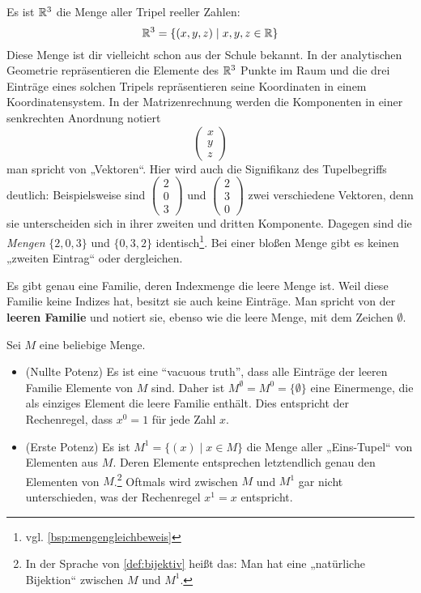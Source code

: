 \begin{bsp}
    Es ist $\mathbb R^3$ die Menge aller Tripel reeller Zahlen:
        \[ \mathbb R^3 = \{(x,y,z) \mid x,y,z\in \mathbb R \} \]
    Diese Menge ist dir vielleicht schon aus der Schule bekannt. In der analytischen Geometrie repräsentieren die Elemente des $\mathbb R^3$ Punkte im Raum und die drei Einträge eines solchen Tripels repräsentieren seine Koordinaten in einem Koordinatensystem. In der Matrizenrechnung werden die Komponenten in einer senkrechten Anordnung notiert
    \[\begin{pmatrix}
        x \\ y \\ z 
    \end{pmatrix} \]
    man spricht von „Vektoren“. Hier wird auch die Signifikanz des Tupelbegriffs deutlich: Beispielsweise sind $\begin{pmatrix} 2 \\ 0 \\ 3 \end{pmatrix}$ und $\begin{pmatrix} 2 \\ 3 \\ 0 \end{pmatrix}$ zwei verschiedene Vektoren, denn sie unterscheiden sich in ihrer zweiten und dritten Komponente. Dagegen sind die \emph{Mengen} $\{2,0,3\}$ und $\{0,3,2\}$ identisch\footnote{vgl. \cref{bsp:mengengleichbeweis}}. Bei einer bloßen Menge gibt es keinen „zweiten Eintrag“ oder dergleichen.
\end{bsp}


\begin{de} \label{def:leerefam}
    Es gibt genau eine Familie, deren Indexmenge die leere Menge ist. Weil diese Familie keine Indizes hat, besitzt sie auch keine Einträge. Man spricht von der \textbf{leeren Familie} und notiert sie, ebenso wie die leere Menge, mit dem Zeichen $\emptyset$.
\end{de}


\begin{bem}
    Sei $M$ eine beliebige Menge.
    \begin{itemize}
        \item(Nullte Potenz) Es ist eine ``vacuous truth'', dass alle Einträge der leeren Familie Elemente von $M$ sind. Daher ist $M^\emptyset=M^0 = \{\emptyset\}$ eine Einermenge, die als einziges Element die leere Familie enthält. Dies entspricht der Rechenregel, dass $x^0=1$ für jede Zahl $x$.
        \item(Erste Potenz) Es ist $M^1 = \{(x)\mid x\in M\}$ die Menge aller „Eins-Tupel“ von Elementen aus $M$. Deren Elemente entsprechen letztendlich genau den Elementen von $M$.\footnote{In der Sprache von \cref{def:bijektiv} heißt das: Man hat eine „natürliche Bijektion“ zwischen $M$ und $M^1$.} Oftmals wird zwischen $M$ und $M^1$ gar nicht unterschieden, was der Rechenregel $x^1=x$ entspricht.
    \end{itemize}
\end{bem}





